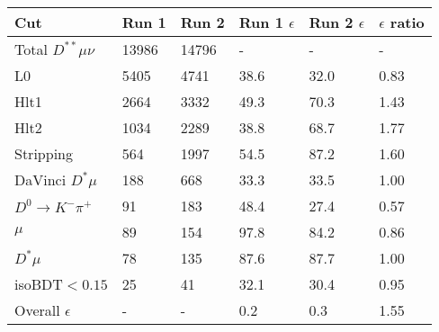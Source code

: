 \begin{tabular}{llllll}
\toprule
 Cut                       & Run 1   & Run 2   & Run 1 $\epsilon$   & Run 2 $\epsilon$   & $\epsilon$ ratio   \\
\midrule
 Total $D^{**}\mu\nu$      & 13986   & 14796   & -                  & -                  & -                  \\
 L0                        & 5405    & 4741    & 38.6               & 32.0               & 0.83               \\
 Hlt1                      & 2664    & 3332    & 49.3               & 70.3               & 1.43               \\
 Hlt2                      & 1034    & 2289    & 38.8               & 68.7               & 1.77               \\
 Stripping                 & 564     & 1997    & 54.5               & 87.2               & 1.60               \\
 DaVinci $D^* \mu$         & 188     & 668     & 33.3               & 33.5               & 1.00               \\
 $D^0\rightarrow K^-\pi^+$ & 91      & 183     & 48.4               & 27.4               & 0.57               \\
 $\mu$                     & 89      & 154     & 97.8               & 84.2               & 0.86               \\
 $D^* \mu$                 & 78      & 135     & 87.6               & 87.7               & 1.00               \\
 isoBDT$ < 0.15$           & 25      & 41      & 32.1               & 30.4               & 0.95               \\
 Overall $\epsilon$        & -       & -       & 0.2                & 0.3                & 1.55               \\
\bottomrule
\end{tabular}
